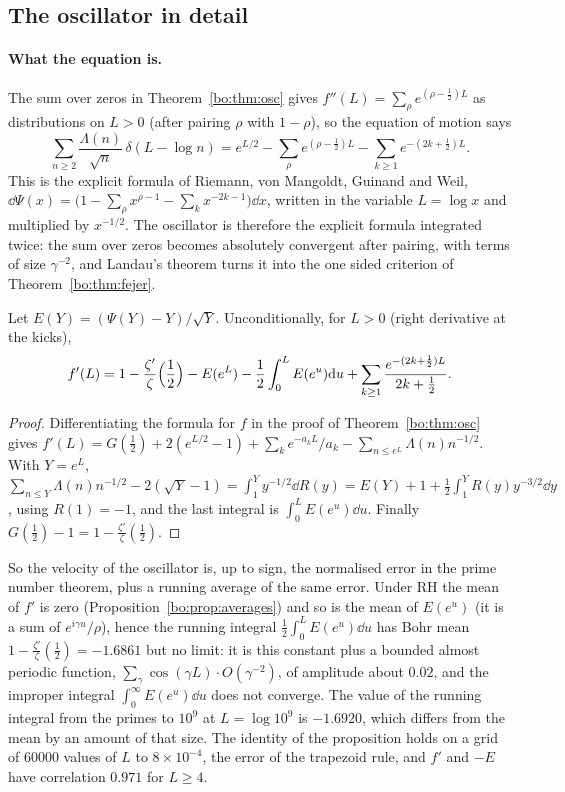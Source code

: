 \subsection{The oscillator in detail}\label{bo:sec:oscdetail}

\paragraph{What the equation is.} The sum over zeros in Theorem~\ref{bo:thm:osc} gives $f''(L)=\sum_\rho e^{(\rho-\frac12)L}$ as distributions on $L>0$ (after pairing $\rho$ with $1-\rho$), so the equation of motion says
\[
\sum_{n\ge2}\frac{\Lambda(n)}{\sqrt n}\,\delta(L-\log n)=e^{L/2}-\sum_\rho e^{(\rho-\frac12)L}-\sum_{k\ge1}e^{-(2k+\frac12)L}.
\]
This is the explicit formula of Riemann, von Mangoldt, Guinand and Weil, $\dd\Psi(x)=\bigl(1-\sum_\rho x^{\rho-1}-\sum_kx^{-2k-1}\bigr)\dd x$, written in the variable $L=\log x$ and multiplied by $x^{-1/2}$. The oscillator is therefore the explicit formula integrated twice: the sum over zeros becomes absolutely convergent after pairing, with terms of size $\gamma^{-2}$, and Landau's theorem turns it into the one sided criterion of Theorem~\ref{bo:thm:fejer}.

\begin{proposition}[Velocity]\label{bo:prop:velocity}
Let $E(Y)=(\Psi(Y)-Y)/\sqrt Y$. Unconditionally, for $L>0$ (right derivative at the kicks),
\[
f'(L)=1-\frac{\zeta'}{\zeta}\Bigl(\frac12\Bigr)-E(e^L)-\frac12\int_0^LE(e^u)\mathrm{d} u+\sum_{k\ge1}\frac{e^{-(2k+\frac12)L}}{2k+\frac12}.
\]
\end{proposition}

\begin{proof}
Differentiating the formula for $f$ in the proof of Theorem~\ref{bo:thm:osc} gives $f'(L)=G(\frac12)+2(e^{L/2}-1)+\sum_ke^{-a_kL}/a_k-\sum_{n\le e^L}\Lambda(n)n^{-1/2}$. With $Y=e^L$, $\sum_{n\le Y}\Lambda(n)n^{-1/2}-2(\sqrt Y-1)=\int_1^Yy^{-1/2}\dd R(y)=E(Y)+1+\frac12\int_1^YR(y)y^{-3/2}\dd y$, using $R(1)=-1$, and the last integral is $\int_0^LE(e^u)\dd u$. Finally $G(\frac12)-1=1-\frac{\zeta'}{\zeta}(\frac12)$.
\end{proof}

So the velocity of the oscillator is, up to sign, the normalised error in the prime number theorem, plus a running average of the same error. Under RH the mean of $f'$ is zero (Proposition~\ref{bo:prop:averages}) and so is the mean of $E(e^u)$ (it is a sum of $e^{i\gamma u}/\rho$), hence the running integral $\frac12\int_0^LE(e^u)\dd u$ has Bohr mean $1-\frac{\zeta'}{\zeta}(\frac12)=-1.6861$ but no limit: it is this constant plus a bounded almost periodic function, $\sum_\gamma\cos(\gamma L)\cdot O(\gamma^{-2})$, of amplitude about $0.02$, and the improper integral $\int_0^\infty E(e^u)\dd u$ does not converge. The value of the running integral from the primes to $10^9$ at $L=\log10^9$ is $-1.6920$, which differs from the mean by an amount of that size. %
The identity of the proposition holds on a grid of $60000$ values of $L$ to $8\times10^{-4}$, the error of the trapezoid rule, and $f'$ and $-E$ have correlation $0.971$ for $L\ge4$.

